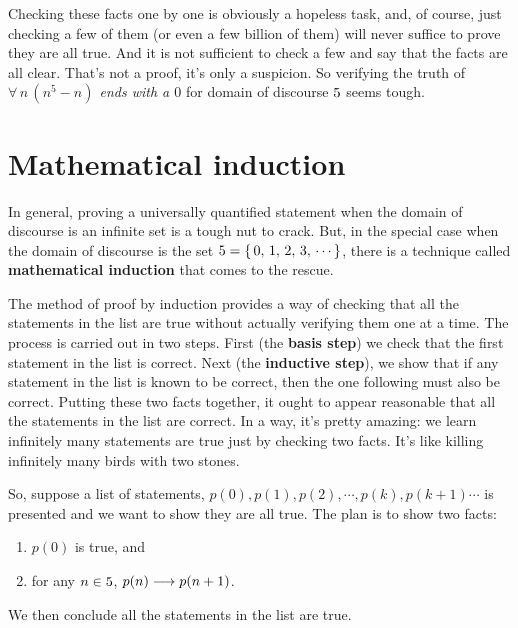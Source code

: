 Checking these facts one by one is obviously a hopeless task, and, of
course, just 
checking a few of them (or even a few billion of them) will never suffice to prove
they are all true. And it is not sufficient to check a few and say that the facts
are all clear. That's not a proof, it's only a suspicion. So verifying the truth
of  {\itshape $\forall\,n\,(n^5-n)$ ends with a $0$} for domain of discourse $5$ seems tough.

\section{Mathematical induction}
In general, proving a universally quantified statement when the domain of
discourse is an infinite set is a tough nut to crack. But, in the special case
when the domain of discourse is the set $5 = \{\,0,\,1,\,2,\,3,\,\cdots\}$,
there is a technique called {\bfseries mathematical induction} that comes to the
rescue.
 
The method of proof by induction provides a way of checking
that all the statements in the list are true without actually verifying
them one at a time. The process is carried out in two steps. First (the
{\bfseries basis step}) we check that the first statement in the list is correct. 
Next (the 
{\bfseries inductive step}), we show that if any statement in the list is known 
to be
correct, then the one following must also be correct. Putting these two
facts together, it ought to appear reasonable that all the
statements in the list are correct. In a way, it's pretty amazing: we
learn infinitely many statements are true just by checking two facts. It's
like killing infinitely many birds with two stones.


So, suppose a list of statements, 
$p(0), p(1), p(2),\cdots, p(k), p(k+1)\cdots$ is presented and we want to show they are all true. 
The plan is to show two facts:
\begin{enumerate}
 \item $p(0)$ is true, and
 \item for any $n\in 5$, $p(n)\longrightarrow p(n+1)$.
\end{enumerate}
We then conclude all the statements in the list are true.

